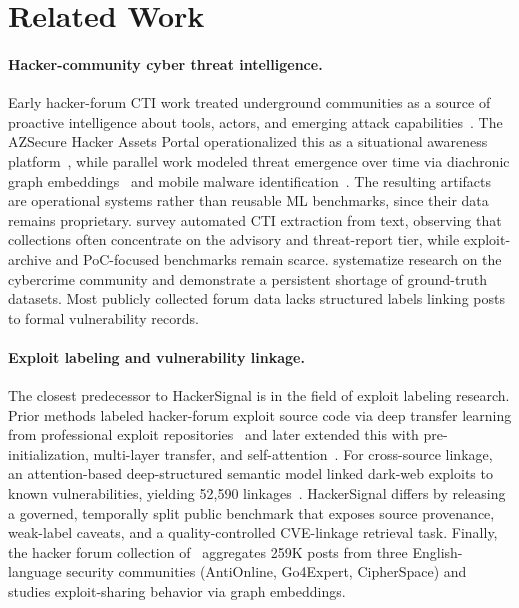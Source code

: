 \documentclass{article}
\begin{document}
\section{Related Work}

\paragraph{Hacker-community cyber threat intelligence.} Early hacker-forum CTI work treated underground communities as a source of proactive intelligence about tools, actors, and emerging attack capabilities~\citep{samtani2015assets, samtani2017jmis}. The AZSecure Hacker Assets Portal operationalized this as a situational awareness platform~\citep{samtani2021hap}, while parallel work modeled threat emergence over time via diachronic graph embeddings~\citep{samtani2020dgef} and mobile malware identification~\citep{grisham2017mobile}. The resulting artifacts are operational systems rather than reusable ML benchmarks, since their data remains proprietary. \citet{rahman2023cti} survey automated CTI extraction from text, observing that collections often concentrate on the advisory and threat-report tier, while exploit-archive and PoC-focused benchmarks remain scarce. \citet{hughes2024cybercrime} systematize research on the cybercrime community and demonstrate a persistent shortage of ground-truth datasets. Most publicly collected forum data lacks structured labels linking posts to formal vulnerability records.

\paragraph{Exploit labeling and vulnerability linkage.}
The closest predecessor to HackerSignal is in the field of exploit labeling research. Prior methods labeled hacker-forum exploit source code via deep transfer learning from professional exploit repositories~\citep{ampel2020dtl} and later extended this with pre-initialization, multi-layer transfer, and self-attention~\citep{ampel2024misq}. For cross-source linkage, an attention-based deep-structured semantic model linked dark-web exploits to known vulnerabilities, yielding 52,590 linkages~\citep{samtani2022eva}. HackerSignal differs by releasing a governed, temporally split public benchmark that exposes source provenance, weak-label caveats, and a quality-controlled CVE-linkage retrieval task. Finally, the hacker forum collection of~\citet{otto2021isi} aggregates 259K posts from three English-language security communities (AntiOnline, Go4Expert, CipherSpace) and studies exploit-sharing behavior via graph embeddings.
\end{document}
